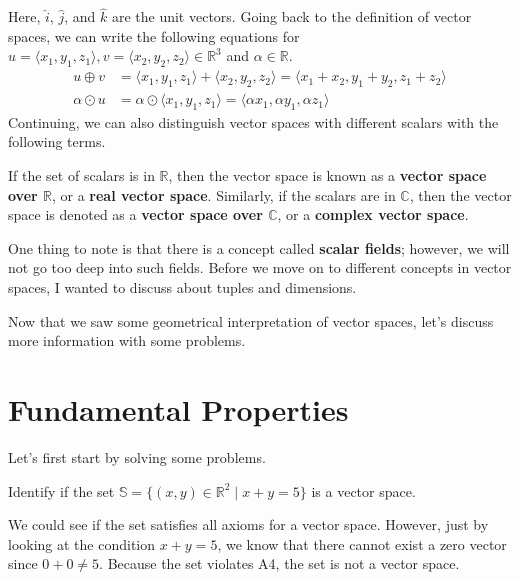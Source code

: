 \documentclass[../main.tex]{subfiles}
\begin{document}
Here, $\hat{i}$, $\hat{j}$, and $\hat{k}$ are the unit vectors.
Going back to the definition of vector spaces, we can write the
following equations for $u = \langle x_1, y_1, z_1 \rangle,
v = \langle x_2, y_2, z_2 \rangle \in \mathbb{R}^3$ and $\alpha
\in \mathbb{R}$.
\begin{align*}
    u \oplus v
    &= \langle x_1, y_1, z_1 \rangle + \langle x_2, y_2, z_2 \rangle
    = \langle x_1 + x_2, y_1 + y_2, z_1 + z_2 \rangle \\
    \alpha \odot u
    &= \alpha \odot \langle x_1, y_1, z_1 \rangle
    = \langle \alpha x_1, \alpha y_1, \alpha z_1 \rangle
\end{align*}
Continuing, we can also distinguish vector spaces with different
scalars with the following terms.

\begin{definition}
If the set of scalars is in $\mathbb{R}$, then the vector space
is known as a \textbf{vector space over $\mathbb{R}$}, or a
\textbf{real vector space}. Similarly, if the scalars are in
$\mathbb{C}$, then the vector space is denoted as a
\textbf{vector space over $\mathbb{C}$}, or a \textbf{complex vector
space}.
\end{definition}

One thing to note is that there is a concept called \textbf{scalar
fields}; however, we will not go too deep into such fields.
Before we move on to different concepts in vector spaces, I wanted
to discuss about tuples and dimensions.

Now that we saw some geometrical interpretation of vector spaces,
let's discuss more information with some problems.

\section{Fundamental Properties}

Let's first start by solving some problems.

\begin{problem}
Identify if the set $\mathbb{S} = \{ (x, y) \in \mathbb{R}^2 \mid
x + y = 5 \}$ is a vector space.
\end{problem}
\begin{solution}
We could see if the set satisfies all axioms for a vector space.
However, just by looking at the condition $x + y = 5$, we know that
there cannot exist a zero vector since $0 + 0 \neq 5$. Because the
set violates A4, the set is not a vector space.
\end{solution}
\end{document}
